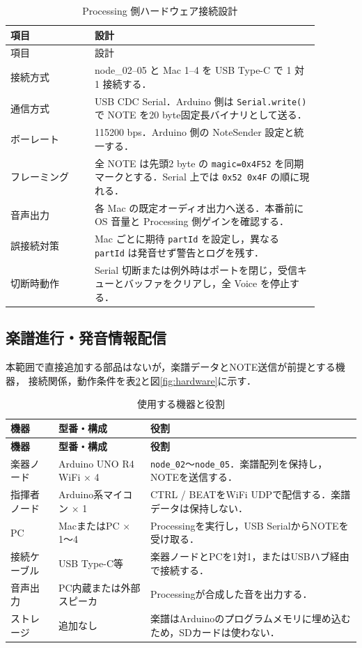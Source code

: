\documentclass[lualatex,book,paper=a4paper,jafontsize=11.5pt,jafontscale=1.05]{jlreq}
\newcommand{\code}[1]{\texttt{#1}}
\begin{document}
\begin{longtable}{p{0.24\linewidth}p{0.64\linewidth}}
\caption{Processing 側ハードウェア接続設計}\label{tab:hw-design}\\
\toprule
項目 & 設計 \\
\midrule
\endfirsthead
\toprule
項目 & 設計 \\
\midrule
\endhead
接続方式 & node\_02--05 と Mac 1--4 を USB Type-C で 1 対 1 接続する． \\
通信方式 & USB CDC Serial．Arduino 側は \texttt{Serial.write()} で NOTE を20 byte固定長バイナリとして送る． \\
ボーレート & 115200 bps．Arduino 側の NoteSender 設定と統一する． \\
フレーミング & 全 NOTE は先頭2 byte の \texttt{magic=0x4F52} を同期マークとする．Serial 上では \texttt{0x52 0x4F} の順に現れる． \\
音声出力 & 各 Mac の既定オーディオ出力へ送る．本番前に OS 音量と Processing 側ゲインを確認する． \\
誤接続対策 & Mac ごとに期待 \texttt{partId} を設定し，異なる \texttt{partId} は発音せず警告とログを残す． \\
切断時動作 & Serial 切断または例外時はポートを閉じ，受信キューとバッファをクリアし，全 Voice を停止する． \\
\bottomrule
\end{longtable}
\subsection{楽譜進行・発音情報配信}
本範囲で直接追加する部品はないが，楽譜データとNOTE送信が前提とする機器，
接続関係，動作条件を表\ref{tab:hardware}と図\ref{fig:hardware}に示す．

\begin{longtable}{p{}p{}p{}}
\caption{使用する機器と役割}\label{tab:hardware}\\
\toprule
\textbf{機器} & \textbf{型番・構成} & \textbf{役割} \\
\midrule
\endfirsthead
\toprule
\textbf{機器} & \textbf{型番・構成} & \textbf{役割} \\
\midrule
\endhead
楽器ノード & Arduino UNO R4 WiFi × 4 & \code{node\_02}〜\code{node\_05}．楽譜配列を保持し，NOTEを送信する．\\
指揮者ノード & Arduino系マイコン × 1 & CTRL / BEATをWiFi UDPで配信する．楽譜データは保持しない．\\
PC & MacまたはPC × 1〜4 & Processingを実行し，USB SerialからNOTEを受け取る．\\
接続ケーブル & USB Type-C等 & 楽器ノードとPCを1対1，またはUSBハブ経由で接続する．\\
音声出力 & PC内蔵または外部スピーカ & Processingが合成した音を出力する．\\
ストレージ & 追加なし & 楽譜はArduinoのプログラムメモリに埋め込むため，SDカードは使わない．\\
\bottomrule
\end{longtable}
\end{document}
